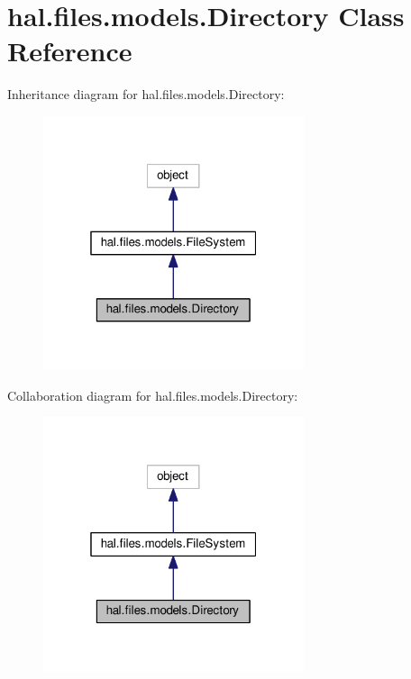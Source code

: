 \hypertarget{classhal_1_1files_1_1models_1_1_directory}{}\section{hal.\+files.\+models.\+Directory Class Reference}
\label{classhal_1_1files_1_1models_1_1_directory}


Inheritance diagram for hal.\+files.\+models.\+Directory\+:\nopagebreak
\begin{figure}[H]
\begin{center}
\leavevmode
\includegraphics[width=217pt]{classhal_1_1files_1_1models_1_1_directory__inherit__graph}
\end{center}
\end{figure}


Collaboration diagram for hal.\+files.\+models.\+Directory\+:\nopagebreak
\begin{figure}[H]
\begin{center}
\leavevmode
\includegraphics[width=217pt]{classhal_1_1files_1_1models_1_1_directory__coll__graph}
\end{center}
\end{figure}
